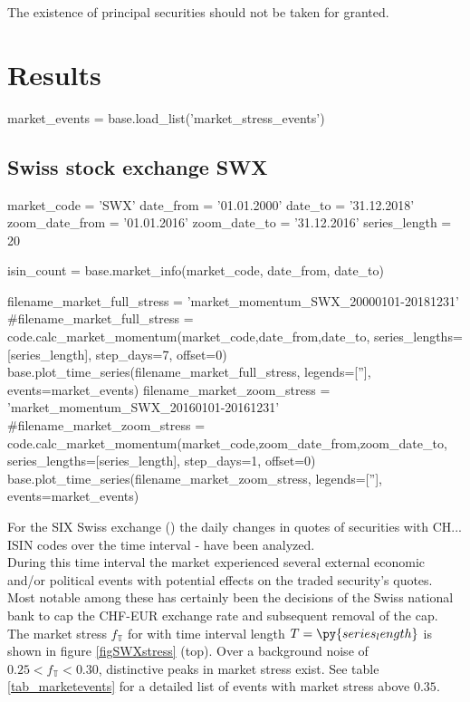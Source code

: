 \documentclass[11pt,twoside,a4paper]{article}
\begin{document}
The existence of principal securities should not be taken for granted.
\FloatBarrier
\pagebreak
\section{Results}
\begin{pycode}
market_events = base.load_list('market_stress_events')
\end{pycode}
\subsection{Swiss stock exchange SWX}
\begin{pycode}
market_code = 'SWX'
date_from = '01.01.2000'
date_to = '31.12.2018'
zoom_date_from = '01.01.2016'
zoom_date_to = '31.12.2016'
series_length = 20

isin_count = base.market_info(market_code, date_from, date_to)

filename_market_full_stress = 'market_momentum_SWX_20000101-20181231'
#filename_market_full_stress = code.calc_market_momentum(market_code,date_from,date_to, series_lengths=[series_length], step_days=7, offset=0)
base.plot_time_series(filename_market_full_stress, legends=[''], events=market_events)
filename_market_zoom_stress = 'market_momentum_SWX_20160101-20161231'
#filename_market_zoom_stress = code.calc_market_momentum(market_code,zoom_date_from,zoom_date_to, series_lengths=[series_length], step_days=1, offset=0)
base.plot_time_series(filename_market_zoom_stress, legends=[''], events=market_events)
\end{pycode}
For the SIX Swiss exchange () the daily changes in quotes of  securities with CH... ISIN codes over the time interval  -  have been analyzed.\\
During this time interval the market experienced several external economic and/or political events with potential effects on the traded security's quotes. Most notable among these has certainly been the decisions of the Swiss national bank to cap the CHF-EUR exchange rate and subsequent removal of the cap.\\

The market stress $f_\mathbb{T}$ for  with time interval length $T=\py{series_length}$ is shown in figure \ref{figSWXstress} (top). Over a background noise of $0.25 < f_\mathbb{T} < 0.30$, distinctive peaks in market stress exist. See table \ref{tab_marketevents} for a detailed list of events with market stress above $0.35$.\\
\end{document}
